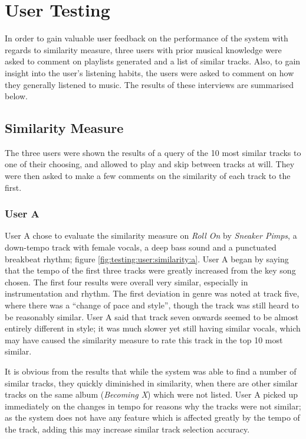 \section{User Testing}
\label{text:testing:user}
In order to gain valuable user feedback on the performance of the system with regards to similarity measure, three users with prior musical knowledge were asked to comment on playlists generated and a list of similar tracks. Also, to gain insight into the user's listening habits, the users were asked to comment on how they generally listened to music. The results of these interviews are summarised below.
\subsection{Similarity Measure}
The three users were shown the results of a query of the 10 most similar tracks to one of their choosing, and allowed to play and skip between tracks at will. They were then asked to make a few comments on the similarity of each track to the first.
\subsubsection{User A}
User A chose to evaluate the similarity measure on \emph{Roll On} by \emph{Sneaker Pimps}, a down-tempo track with female vocals, a deep bass sound and a punctuated breakbeat rhythm; figure \ref{fig:testing:user:similarity:a}. User A began by saying that the tempo of the first three tracks were greatly increased from the key song chosen. The first four results were overall very similar, especially in instrumentation and rhythm. The first deviation in genre was noted at track five, where there was a ``change of pace and style'', though the track was still heard to be reasonably similar. User A said that track seven onwards seemed to be almost entirely different in style; it was much slower yet still having similar vocals, which may have caused the similarity measure to rate this track in the top 10 most similar.


It is obvious from the results that while the system was able to find a number of similar tracks, they quickly diminished in similarity, when there are other similar tracks on the same album (\emph{Becoming X}) which were not listed. User A picked up immediately on the changes in tempo for reasons why the tracks were not similar; as the system does not have any feature which is affected greatly by the tempo of the track, adding this may increase similar track selection accuracy.
